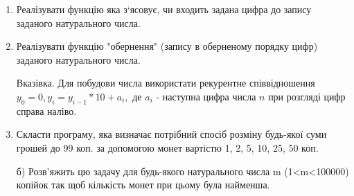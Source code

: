 \documentclass[]{article}
\makeatletter
\newcommand{\xslalph}[1]{\expandafter\@xslalph\csname c@#1\endcsname}
\newcommand{\@xslalph}[1]{%
    \ifcase#1\or а\or б\or в\or г\or д\or e\or є\or ж\or з\or i%
    \or й\or к\or л\or м\or н\or о\or п\or р\or с\or т%
    \or у\or ф\or х\or ц\or ч\or ш\or ю\or я\or аа\or бб\or вв %
    \else\@ctrerr\fi%
}
\makeatother
\begin{document}
\begin{enumerate}
\begin{enumerate}[label=\xslalph*)]
\end{enumerate}

\item
Реалізувати функцію яка з`ясовує, чи входить задана цифра до запису
заданого натурального числа.
\item
Реалізувати функцію "обернення" (запису в оберненому порядку цифр)
заданого натурального числа.

Вказівка. Для побудови числа використати рекурентне співвідношення
\(y_{0} = 0,y_{i} = y_{i - 1}*10 + a_{i},\) де \(a_{i}\) - наступна
цифра числа \(n\) при розгляді цифр справа наліво.

\item
Скласти програму, яка визначає потрібний спосіб розміну будь-якої суми
грошей до 99 коп. за допомогою монет вартістю 1, 2, 5, 10, 25, 50 коп.

б) Розв'яжить цю задачу для будь-якого натурального числа m
(1\textless{}m\textless{}100000) копійок так щоб кількість монет при
цьому була найменша.



\end{enumerate}
\end{document}
